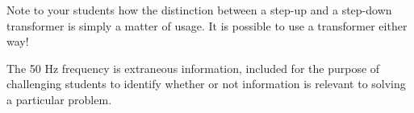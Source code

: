Note to your students how the distinction between a step-up and a step-down transformer is simply a matter of usage.  It is possible to use a transformer either way!

\vskip 10pt

The 50 Hz frequency is extraneous information, included for the purpose of challenging students to identify whether or not information is relevant to solving a particular problem.




